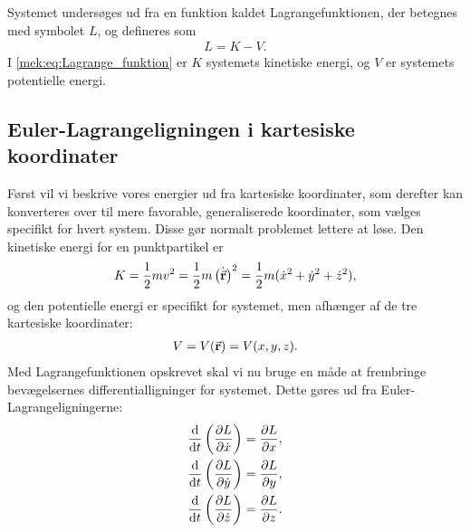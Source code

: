 Systemet undersøges ud fra en funktion kaldet Lagrangefunktionen, der betegnes med symbolet $L$, og defineres som
%
\begin{align} \label{mek:eq:Lagrange_funktion}
	L = K - V.
\end{align}
%
I \cref{mek:eq:Lagrange_funktion} er $K$ systemets kinetiske energi, og $V$ er systemets potentielle energi.

\subsection*{Euler-Lagrangeligningen i kartesiske koordinater}
Først vil vi beskrive vores energier ud fra kartesiske koordinater, som derefter kan konverteres over til mere favorable, generaliserede koordinater, som vælges specifikt for hvert system. Disse gør normalt problemet lettere at løse. %
Den kinetiske energi for en punktpartikel er
%
\begin{align}\label{mek:eq:Kinetisk_kartesisk}
	K = \frac{1}{2} m v^2 = \frac{1}{2} m \left(\dot{\va{r}}\right)^2 = \frac{1}{2} m (\dot{x}^2 + \dot{y}^2 + \dot{z}^2),
\end{align}
%
og den potentielle energi er specifikt for systemet, men afhænger af de tre kartesiske koordinater:
%
\begin{align}\label{mek:eq:Potentiel_kartesisk}
	V = V(\va{r}) = V(x,y,z).
\end{align}
%
Med Lagrangefunktionen opskrevet skal vi nu bruge en måde at frembringe bevægelsernes differentialligninger for systemet. Dette gøres ud fra Euler-Lagrangeligningerne:
%
\begin{equation} \label{mek:eq:el_kartesisk}
\begin{aligned}
	\dv{}{t} \left( \pdv{L}{\dot{x}} \right) &= \pdv{L}{x}, \\%
	\dv{}{t} \left( \pdv{L}{\dot{y}} \right) &= \pdv{L}{y}, \\%
	\dv{}{t} \left( \pdv{L}{\dot{z}} \right) &= \pdv{L}{z}.
\end{aligned}
\end{equation}
%
